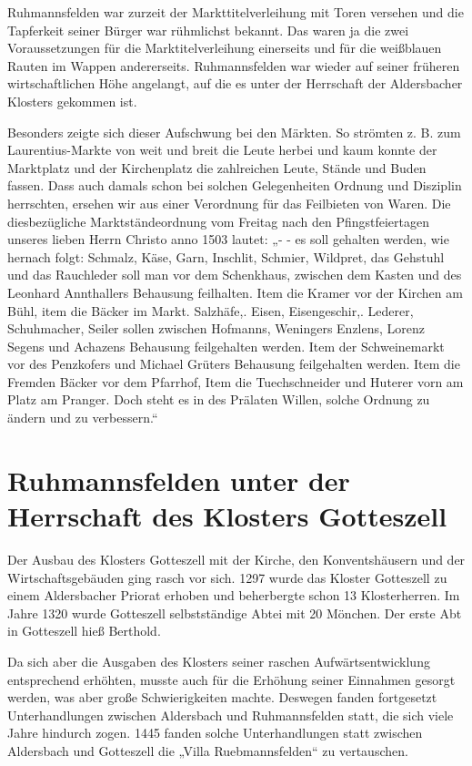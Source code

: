 \documentclass[12pt,a4pager]{book}
\begin{document}
Ruhmannsfelden war zurzeit der Markttitelverleihung mit Toren versehen und die
Tapferkeit seiner Bürger war rühmlichst bekannt. Das waren ja die zwei
Voraussetzungen für die Marktitelverleihung einerseits und für die weißblauen
Rauten im Wappen andererseits. Ruhmannsfelden war wieder auf seiner früheren
wirtschaftlichen Höhe angelangt, auf die es unter der Herrschaft der
Aldersbacher Klosters gekommen ist.

Besonders zeigte sich dieser Aufschwung bei den Märkten. So strömten z. B. zum
Laurentius-Markte von weit und breit die Leute herbei und kaum konnte der
Marktplatz und der Kirchenplatz die zahlreichen Leute, Stände und Buden fassen.
Dass auch damals schon bei solchen Gelegenheiten Ordnung und Disziplin
herrschten, ersehen wir aus einer Verordnung für das Feilbieten von Waren. Die
diesbezügliche Marktständeordnung vom Freitag nach den Pfingstfeiertagen unseres
lieben Herrn Christo anno 1503 lautet: „- - es soll gehalten werden, wie hernach
folgt: Schmalz, Käse, Garn, Inschlit, Schmier, Wildpret, das Gehstuhl und das
Rauchleder soll man vor dem Schenkhaus, zwischen dem Kasten und des Leonhard
Annthallers Behausung feilhalten. Item die Kramer vor der Kirchen am Bühl, item
die Bäcker im Markt. Salzhäfe,. Eisen, Eisengeschir,. Lederer, Schuhmacher,
Seiler sollen zwischen Hofmanns, Weningers Enzlens, Lorenz Segens und Achazens
Behausung feilgehalten werden. Item der Schweinemarkt vor des Penzkofers und
Michael Grüters Behausung feilgehalten werden. Item die Fremden Bäcker vor dem
Pfarrhof, Item die Tuechschneider und Huterer vorn am Platz am Pranger. Doch
steht es in des Prälaten Willen, solche Ordnung zu ändern und zu verbessern.“

\section{Ruhmannsfelden unter der Herrschaft des Klosters Gotteszell}

Der Ausbau des Klosters Gotteszell mit der Kirche, den Konventshäusern und der
Wirtschaftsgebäuden ging rasch vor sich. 1297 wurde das Kloster Gotteszell zu
einem Aldersbacher Priorat erhoben und beherbergte schon 13 Klosterherren. Im
Jahre 1320 wurde Gotteszell selbstständige Abtei mit 20 Mönchen. Der erste Abt
in Gotteszell hieß Berthold.

Da sich aber die Ausgaben des Klosters seiner raschen Aufwärtsentwicklung
entsprechend erhöhten, musste auch für die Erhöhung seiner Einnahmen gesorgt
werden, was aber große Schwierigkeiten machte. Deswegen fanden fortgesetzt
Unterhandlungen zwischen Aldersbach und Ruhmannsfelden statt, die sich viele
Jahre hindurch zogen. 1445 fanden solche Unterhandlungen statt zwischen
Aldersbach und Gotteszell die „Villa Ruebmannsfelden“ zu vertauschen.
\end{document}
